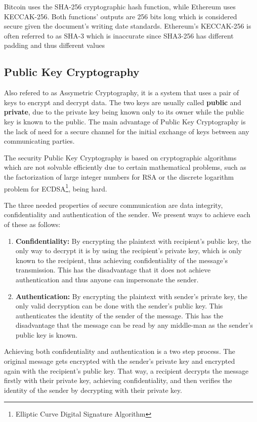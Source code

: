 Bitcoin uses the SHA-256 cryptographic hash function, while Ethereum uses KECCAK-256. Both functions' outputs are 256 bits long which is considered secure given the document's writing date standards. Ethereum's KECCAK-256 is often referred to as SHA-3 which is inaccurate since SHA3-256 has different padding and thus different values\cite{sha3}

\subsection{Public Key Cryptography}
Also refered to as Assymetric Cryptography, it is a system that uses a pair of keys to encrypt and decrypt data. The two keys are usually called \textbf{public} and \textbf{private}, due to the private key being known only to its owner while the public key is known to the public. The main advantage of Public Key Cryptography is the lack of need for a secure channel for the initial exchange of keys between any communicating parties.

The security Public Key Cryptography is based on cryptographic algorithms which are not solvable efficiently due to certain mathematical problems, such as the factorization of large integer numbers for RSA or the discrete logarithm problem for ECDSA\footnote{Elliptic Curve Digital Signature Algorithm}, being hard.

The three needed properties of secure communication are data integrity, confidentiality and authentication of the sender. We present ways to achieve each of these as follows:

\begin{enumerate}
    \item \textbf{Confidentiality:} By encrypting the plaintext with recipient's public key, the only way to decrypt it is by using the recipient's private key, which is only known to the recipient, thus achieving confidentiality of the message's transmission. This has the disadvantage that it does not achieve authentication and thus anyone can impersonate the sender.
    \item \textbf{Authentication:} By encrypting the plaintext with sender's private key, the only valid decryption can be done with the sender's public key. This authenticates the identity of the sender of the message. This has the disadvantage that the message can be read by any middle-man as the sender's public key is known.
\end{enumerate}

Achieving both confidentiality and authentication is a two step process. The original message gets encrypted with the sender's private key and encrypted again with the recipient's public key. That way, a recipient decrypts the message firstly with their private key, achieving confidentiality, and then verifies the identity of the sender by decrypting with their private key.

